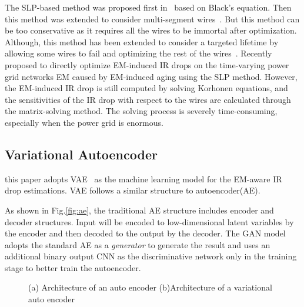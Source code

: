 The SLP-based method was proposed first in~\cite{Tan:DAC'99} based on Black's equation. Then this method was extended to consider multi-segment wires~\cite{ZhouSun:ASPDAC'18}. But this method can be too conservative as it requires all the wires to be immortal after optimization. Although, this method has been extended to consider a targeted lifetime by allowing some wires to fail and optimizing the rest of the wires~\cite{ZhouSun:TVLSI'19}.  Recently~\cite{Sukharev:2019pg} proposed to directly optimize EM-induced IR drops on the time-varying power grid networks EM caused by EM-induced aging using the SLP method. However, the EM-induced IR drop is still computed by solving Korhonen equations, and the sensitivities of the IR drop with respect to the wires are calculated through the matrix-solving method.  
The solving process is severely time-consuming, especially when the power grid is enormous.


\subsection{Variational Autoencoder}
\label{subsec:vae_intro}
this paper adopts VAE~\cite{Diederik:arxiv'22} as the machine learning model for the EM-aware IR drop estimations. 
VAE follows a similar structure to autoencoder(AE).

As shown in Fig.\ref{fig:ae}, the traditional AE structure includes encoder and decoder structures. Input will be encoded to low-dimensional latent variables by the encoder and then decoded to the output by the decoder.  
The GAN model adopts the standard AE as a \textit{generator} to generate the result and uses an additional binary output CNN as the discriminative network only in the training stage to better train the autoencoder. 


\begin{figure}[htp]
	\centering
	\caption{(a) Architecture of an auto encoder (b)Architecture of a variational auto encoder }
	\label{fig:compare_ae_vae}
\end{figure}


